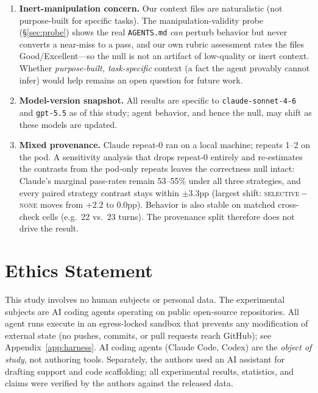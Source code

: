 \documentclass[11pt]{article}
\newcommand{\agentsmd}{\texttt{AGENTS.md}}
\newcommand{\none}{\textsc{none}}
\newcommand{\selective}{\textsc{selective}}
\begin{document}
\begin{enumerate}
    \item \textbf{Inert-manipulation concern.} Our context files are naturalistic (not purpose-built for specific tasks). The manipulation-validity probe (\S\ref{sec:probe}) shows the real \agentsmd{} \emph{can} perturb behavior but never converts a near-miss to a pass, and our own rubric assessment rates the files Good/Excellent---so the null is not an artifact of low-quality or inert context. Whether \emph{purpose-built, task-specific} context (a fact the agent provably cannot infer) would help remains an open question for future work.
    \item \textbf{Model-version snapshot.} All results are specific to \texttt{claude-sonnet-4-6} and \texttt{gpt-5.5} as of this study; agent behavior, and hence the null, may shift as these models are updated.
    \item \textbf{Mixed provenance.} Claude repeat-0 ran on a local machine; repeats 1--2 on the pod. A sensitivity analysis that drops repeat-0 entirely and re-estimates the contrasts from the pod-only repeats leaves the correctness null intact: Claude's marginal pass-rates remain 53--55\% under all three strategies, and every paired strategy contrast stays within ${\pm}3.3$pp (largest shift: \selective{}\,$-$\,\none{} moves from $+2.2$ to $0.0$pp). Behavior is also stable on matched cross-check cells (e.g.\ 22 vs.\ 23 turns). The provenance split therefore does not drive the result.
\end{enumerate}

\section*{Ethics Statement}
This study involves no human subjects or personal data. The experimental subjects are
AI coding agents operating on public open-source repositories. All agent runs execute in
an egress-locked sandbox that prevents any modification of external state (no pushes,
commits, or pull requests reach GitHub); see Appendix~\ref{app:harness}.
AI coding agents (Claude Code, Codex) are the \emph{object of study}, not authoring tools.
Separately, the authors used an AI assistant for drafting support and code scaffolding;
all experimental results, statistics, and claims were verified by the authors against the
released data.
\end{document}
